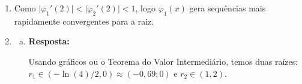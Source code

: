 \documentclass[a4paper,12pt,fleqn]{article}
\begin{document}
\begin{enumerate}
{\begin{enumerate}[(a)]

\item II. $\vert g_b'(1,5) \vert < 1$ (Verifique!)
\item 11

\end{enumerate}

}

\vspace{0.3cm}  

    \item 

    {\color{blue}
    
   Como $\vert \varphi_1'(2) \vert < \vert \varphi_2'(2) \vert < 1$, logo $\varphi_1(x)$ gera sequências mais rapidamente convergentes para a raiz.
    
    }   
    
\vspace{0.3cm}   


\item

\begin{enumerate}[(a)]
\item

      {\color{blue} 
      
         \textbf{Resposta:}
         
         
     
%
%

Usando gráficos ou o Teorema do Valor Intermediário, temos duas raízes: $r_1 \in (-\ln(4)/2,0) \approx (-0,69;0)$ e $r_2 \in (1,2)$.

}
\end{enumerate}
\end{enumerate}
\end{document}
